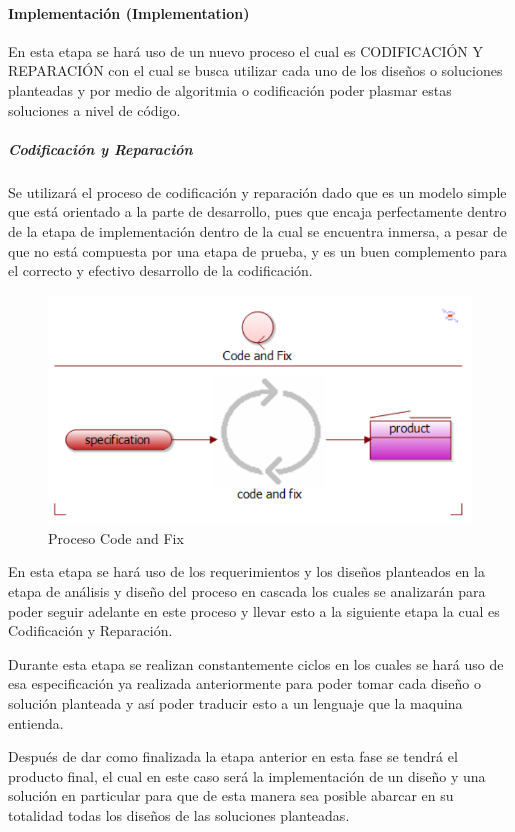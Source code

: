 \paragraph{Implementación (Implementation)}
En esta etapa se hará uso de un nuevo proceso el cual es CODIFICACIÓN Y REPARACIÓN con el cual se busca utilizar cada uno de los diseños o soluciones planteadas y por medio de algoritmia o codificación poder plasmar estas soluciones a nivel de código.

\subparagraph{Codificación y Reparación}
Se utilizará el proceso de codificación y reparación dado que es un modelo simple que está orientado a la parte de desarrollo, pues que encaja perfectamente dentro de la etapa de implementación dentro de la cual se encuentra inmersa, a pesar de que no está compuesta por una etapa de prueba, y es un buen complemento para el correcto y efectivo desarrollo de la codificación.
\begin{figure}[H]
	\centering
	\includegraphics[scale=0.9,]{imagenes/Metodologia/Code-and-fix}
	\caption{Proceso Code and Fix}
	\label{fig:cronograma}
\end{figure}

En esta etapa se hará uso de los requerimientos y los diseños planteados en la etapa de análisis y diseño del proceso en cascada los cuales se analizarán para poder seguir adelante en este proceso y llevar esto a la siguiente etapa la cual es Codificación y Reparación.

Durante esta etapa se realizan constantemente ciclos en los cuales se hará uso de esa especificación ya realizada anteriormente para poder tomar cada diseño o solución planteada y así poder traducir esto a un lenguaje que la maquina entienda.

Después de dar como finalizada la etapa anterior en esta fase se tendrá el producto final, el cual en este caso será la implementación de un diseño y una solución en particular para que de esta manera sea posible abarcar en su totalidad todas los diseños de  las soluciones planteadas.

